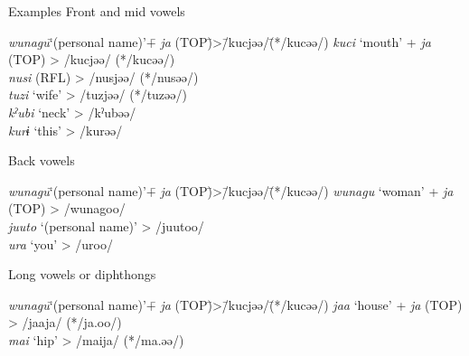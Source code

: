 \begin{exe}
\ex\label{ex:10.2} Examples
\ea Front and mid vowels  
    \begin{tabbing}
    \textit{wunagu}\hspace{\tabcolsep}\=‘(personal name)’\hspace{\tabcolsep}\=+  \textit{ja} (TOP)\hspace{\tabcolsep}\=\hspace{\tabcolsep}>\hspace{\tabcolsep}\=/kucjəə/\hspace{\tabcolsep}\=(*/kucəə/)\kill
    \textit{kuci}  \> ‘mouth’  \> +  \textit{ja} (TOP) \> > \> /kucjəə/  \> (*/kucəə/)\\
    \textit{nusi}  \> (RFL)    \>                      \> > \> /nusjəə/  \> (*/nusəə/)\\
    \textit{tuzi}  \> ‘wife’   \>                      \> > \> /tuzjəə/  \> (*/tuzəə/)\\
    \textit{kˀubi} \>  ‘neck’  \>                      \> > \> /kˀubəə/  \>           \\
    \textit{kurɨ}  \> ‘this’   \>                      \> > \> /kurəə/   \>           \\
    \end{tabbing}
\ex  Back vowels  
    \begin{tabbing}
    \textit{wunagu}\hspace{\tabcolsep}\=‘(personal name)’\hspace{\tabcolsep}\=+  \textit{ja} (TOP)\hspace{\tabcolsep}\=\hspace{\tabcolsep}>\hspace{\tabcolsep}\=/kucjəə/\hspace{\tabcolsep}\=(*/kucəə/)\kill
    \textit{wunagu} \>  ‘woman’          \> +  \textit{ja} (TOP) \> > \> /wunagoo/ \\ 
    \textit{juuto}  \> ‘(personal name)’ \>                      \> > \> /juutoo/  \\
    \textit{ura}    \> ‘you’             \>                      \> > \> /uroo/    \\
    \end{tabbing}
\ex Long vowels or diphthongs  
    \begin{tabbing}
    \textit{wunagu}\hspace{\tabcolsep}\=‘(personal name)’\hspace{\tabcolsep}\=+  \textit{ja} (TOP)\hspace{\tabcolsep}\=\hspace{\tabcolsep}>\hspace{\tabcolsep}\=/kucjəə/\hspace{\tabcolsep}\=(*/kucəə/)\kill
    \textit{jaa} \> ‘house’  \> +  \textit{ja} (TOP) \> > \> /jaaja/ \> (*/ja.oo/)\\
    \textit{mai} \> ‘hip’    \>                      \> > \> /maija/ \> (*/ma.əə/)\\
    \end{tabbing}
\z
\end{exe}
